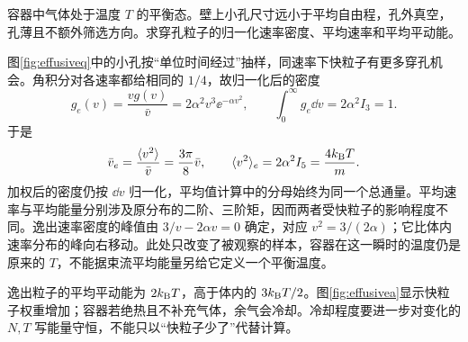 \begin{example}[逸出粒子的速率与能量]\label{ex:effusivesample}
容器中气体处于温度 $T$ 的平衡态。壁上小孔尺寸远小于平均自由程，孔外真空，孔薄且不额外筛选方向。求穿孔粒子的归一化速率密度、平均速率和平均平动能。
\end{example}
\begin{solution}
图\ref{fig:effusiveq}中的小孔按“单位时间经过”抽样，同速率下快粒子有更多穿孔机会。角积分对各速率都给相同的 $1/4$，故归一化后的密度
\[
 g_e(v)=\frac{vg(v)}{\bar v}=2\alpha^2v^3\ee^{-\alpha v^2},\qquad
 \int_0^\infty g_e\dd v=2\alpha^2 I_3=1.
\]
于是
\[
 \bar v_e=\frac{\langle v^2\rangle}{\bar v}
 =\frac{3\pi}8\bar v,\qquad
 \langle v^2\rangle_e=2\alpha^2 I_5=\frac{4k_{\mathrm B} T}{m}.
\]
加权后的密度仍按 $\dd v$ 归一化，平均值计算中的分母始终为同一个总通量。平均速率与平均能量分别涉及原分布的二阶、三阶矩，因而两者受快粒子的影响程度不同。逸出速率密度的峰值由 $3/v-2\alpha v=0$ 确定，对应 $v^2=3/(2\alpha)$；它比体内速率分布的峰向右移动。此处只改变了被观察的样本，容器在这一瞬时的温度仍是原来的 $T$，不能据束流平均能量另给它定义一个平衡温度。

逸出粒子的平均平动能为 $2k_{\mathrm B} T$，高于体内的 $3k_{\mathrm B} T/2$。图\ref{fig:effusivea}显示快粒子权重增加；容器若绝热且不补充气体，余气会冷却。冷却程度要进一步对变化的 $N,T$ 写能量守恒，不能只以“快粒子少了”代替计算。
\end{solution}




